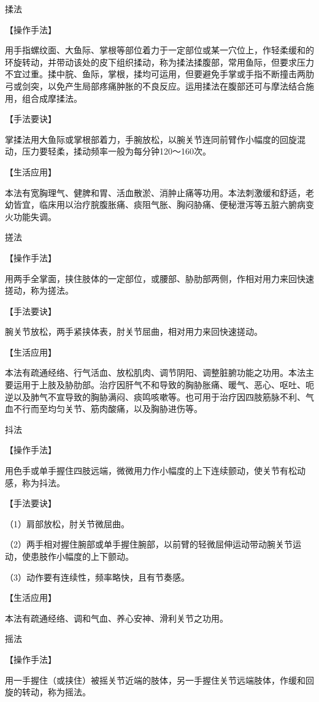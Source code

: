 \documentclass[12pt,UTF8]{ctexbook}
\begin{document}
揉法

【操作手法】

用手指螺纹面、大鱼际、掌根等部位着力于一定部位或某一穴位上，作轻柔缓和的环旋转动，并带动该处的皮下组织揉动，称为揉法揉腹部，常用鱼际，但要求压力不宜过重。揉中脘、鱼际，掌根，揉均可运用，但要避免手掌或手指不断撞击两肋弓或剑突，以免产生局部疼痛肿胀的不良反应。运用揉法在腹部还可与摩法结合施用，组合成摩揉法。

【手法要诀】

掌揉法用大鱼际或掌根部着力，手腕放松，以腕关节连同前臂作小幅度的回旋混动，压力要轻柔，揉动频率一般为每分钟120～160次。

【生活应用】

本法有宽胸理气、健脾和胃、活血散淤、消肿止痛等功用。本法刺激缓和舒适，老幼皆宜，临床用以治疗脘腹胀痛、痰阻气胀、胸闷胁痛、便秘泄泻等五脏六腑病变火功能失调。

搓法

【操作手法】

用两手全掌面，挟住肢体的一定部位，或腰部、胁肋部两侧，作相对用力来回快速搓动，称为搓法。

【手法要诀】

腕关节放松，两手紧挟体表，肘关节屈曲，相对用力来回快速搓动。

【生活应用】

本法有疏通经络、行气活血、放松肌肉、调节阴阳、调整脏腑功能之功用。本法主要运用于上肢及胁肋部。治疗因肝气不和导致的胸胁胀痛、暖气、恶心、呕吐、呃逆以及肺气不宣导致的胸胁满闷、痰鸣咳嗽等。也可用于治疗因四肢筋脉不利、气血不行而至均匀关节、筋肉酸痛，以及胸胁进伤等。

抖法

【操作手法】

用色手或单手握住四肢远端，微微用力作小幅度的上下连续颤动，使关节有松动感，称为抖法。

【手法要诀】

（1）肩部放松，肘关节微屈曲。

（2）两手相对握住腕部或单手握住腕部，以前臂的轻微屈伸运动带动腕关节运动，使患肢作小幅度的上下颤动。

（3）动作要有连续性，频率略快，且有节奏感。

【生活应用】

本法有疏通经络、调和气血、养心安神、滑利关节之功用。

摇法

【操作手法】

用一手握住（或挟住）被摇关节近端的肢体，另一手握住关节远端肢体，作缓和回旋的转动，称为摇法。
\end{document}
